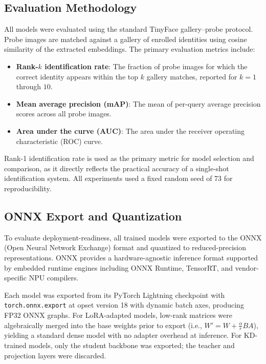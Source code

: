 \documentclass[runningheads,a4paper]{llncs}
\begin{document}
\subsection{Evaluation Methodology}
All models were evaluated using the standard TinyFace gallery--probe protocol. Probe images are matched against a gallery of enrolled identities using cosine similarity of the extracted embeddings. The primary evaluation metrics include:
\begin{itemize}
    \item \textbf{Rank-$k$ identification rate}: The fraction of probe images for which the correct identity appears within the top $k$ gallery matches, reported for $k = 1$ through $10$.
    \item \textbf{Mean average precision (mAP)}: The mean of per-query average precision scores across all probe images.
    \item \textbf{Area under the curve (AUC)}: The area under the receiver operating characteristic (ROC) curve.
\end{itemize}
Rank-1 identification rate is used as the primary metric for model selection and comparison, as it directly reflects the practical accuracy of a single-shot identification system. All experiments used a fixed random seed of 73 for reproducibility.

\subsection{ONNX Export and Quantization}\label{sec:onnx-quant-setup}
To evaluate deployment-readiness, all trained models were exported to the ONNX (Open Neural Network Exchange) format and quantized to reduced-precision representations. ONNX provides a hardware-agnostic inference format supported by embedded runtime engines including ONNX Runtime, TensorRT, and vendor-specific NPU compilers.

Each model was exported from its PyTorch Lightning checkpoint with \texttt{torch.onnx.export} at opset version 18 with dynamic batch axes, producing FP32 ONNX graphs. For LoRA-adapted models, low-rank matrices were algebraically merged into the base weights prior to export (i.e., $W' = W + \frac{\alpha}{r} BA$), yielding a standard dense model with no adapter overhead at inference. For KD-trained models, only the student backbone was exported; the teacher and projection layers were discarded.
\end{document}
